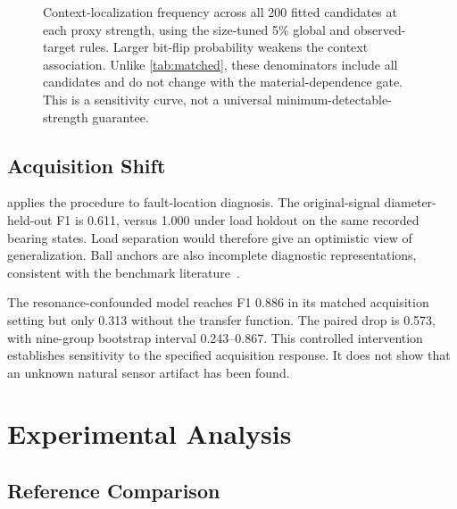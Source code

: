 \documentclass[conference]{IEEEtran}
\begin{document}
\begin{figure}[t]
\centering

\caption{Context-localization frequency across all 200 fitted candidates at each proxy strength, using the size-tuned 5\% global and observed-target rules. Larger bit-flip probability weakens the context association. Unlike \cref{tab:matched}, these denominators include all candidates and do not change with the material-dependence gate. This is a sensitivity curve, not a universal minimum-detectable-strength guarantee.}
\label{fig:proxy-power}
\end{figure}

\subsection{Acquisition Shift}
 applies the procedure to fault-location diagnosis. The original-signal diameter-held-out F1 is 0.611, versus 1.000 under load holdout on the same recorded bearing states. Load separation would therefore give an optimistic view of generalization. Ball anchors are also incomplete diagnostic representations, consistent with the benchmark literature~\cite{smith2015cwru}.

\begin{table}[t]
\centering
\caption{Primary diameter-held-out recording macro F1. Filter removal evaluates the same fitted model on original held-out signals. The acquisition response preserves centered RMS and changes spectral shape.}
\label{tab:spectral}
\footnotesize

\end{table}

The resonance-confounded model reaches F1 0.886 in its matched acquisition setting but only 0.313 without the transfer function. The paired drop is 0.573, with nine-group bootstrap interval 0.243--0.867. This controlled intervention establishes sensitivity to the specified acquisition response. It does not show that an unknown natural sensor artifact has been found.

\section{Experimental Analysis}
\label{sec:analysis}
\subsection{Reference Comparison}
\begin{table}[t]
\centering
\caption{Paired localization comparisons: observed-target bins versus the global rule, using the first test batch per material case. Counts show detections unique to each rule. Exact McNemar $p$-values are Holm-adjusted across twelve primary contrasts, including observed-source comparisons.}
\label{tab:paired}
\footnotesize

\end{table}
\end{document}
